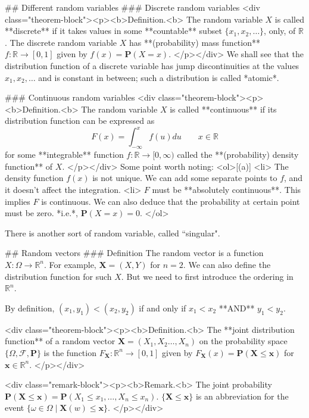 ## Different random variables
### Discrete random variables
<div class="theorem-block"><p><b>Definition.<b> 
The random variable $X$ is called **discrete** if it takes values in some **countable** subset $\{ x_1, x_2, \dots \}$, only, of $\mathbb{R}$. The discrete random variable $X$ has **(probability) mass function** $f : \mathbb{R} \to [0, 1]$ given by $f(x) = \mathbf{P}(X = x)$. 
</p></div>
We shall see that the distribution function of a discrete variable has jump discontinuities 
at the values $x_1 , x_2, \dots$ and is constant in between; such a distribution is called *atomic*.

### Continuous random variables
<div class="theorem-block"><p><b>Definition.<b> 
The random variable $X$ is called **continuous** if its distribution function can 
be expressed as 
$$\begin{equation}
    F(x) = \int_{-\infty}^x f(u) du \qquad x \in \mathbb{R}
\end{equation}$$
for some **integrable** function $f : \mathbb{R} \to [0, \infty)$ called the **(probability) density function** of $X$. 
</p></div>
Some point worth noting:
<ol>[(a)]
    <li> The density function $f(x)$ is not unique. We can add some separate points to $f$, and it doesn't affect the integration.
    <li> $F$ must be **absolutely continuous**. This implies $F$ is continuous. We can also deduce that the probability at certain point must be zero. *i.e.*, $\mathbf{P}(X=x) = 0$.
</ol>

There is another sort of random variable, called ``singular".


## Random vectors
### Definition
The random vector is a function $X : \Omega \to \mathbb{R}^n$. For example, $\mathbf{X} = (X, Y)$ for $n=2$. We can also define the distribution function for such $X$. But we need to first introduce the ordering in $\mathbb{R}^n$.
\begin{center}
    By definition, $(x_1, y_1) < (x_2, y_2)$ if and only if $x_1 < x_2$  **AND**  $y_1 < y_2$.
\end{center}

<div class="theorem-block"><p><b>Definition.<b> 
The **joint distribution function** of a random vector $\mathbf{X} = (X_1, X_2 \dots, X_n)$ on the probability space $\{ \Omega, \mathcal{F}, \mathbf{P} \}$ is the function $F_{\mathbf{X}} : \mathbb{R}^n \to [0, 1]$ given by $F_{\mathbf{X}}(x) = \mathbf{P}(\mathbf{X} \leq \mathbf{x})$ for $\mathbf{x} \in \mathbb{R}^n$. 
</p></div>

<div class="remark-block"><p><b>Remark.<b> 
The joint probability $\mathbf{P}(\mathbf{X} \leq \mathbf{x}) = \mathbf{P}(X_1 \leq x_1, \dots, X_n \leq x_n)$. $\{\mathbf{X} \leq \mathbf{x} \}$ is an abbreviation for the event $\{\omega \in \Omega \;\vert\; \mathbf{X}(w) \leq \mathbf{x}\}$.
</p></div>

